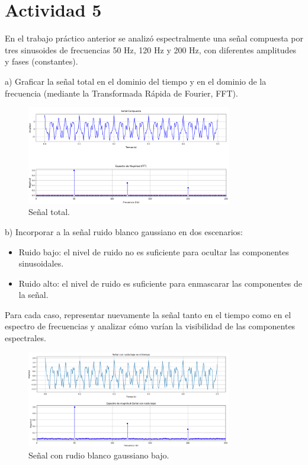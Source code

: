 \section{Actividad 5}
En el trabajo práctico anterior se analizó espectralmente una señal compuesta por tres 
sinusoides de frecuencias 50 Hz, 120 Hz y 200 Hz, con diferentes amplitudes y fases 
(constantes). 

a) Graficar la señal total en el dominio del tiempo y en el dominio de la frecuencia 
(mediante la Transformada Rápida de Fourier, FFT). 

\bigskip
\begin{figure}[H]
\centering
\includegraphics[width=0.8\textwidth]{parte_teorica/senalcompuesta.png}
\caption{Señal total.}
\end{figure}
\bigskip

b) Incorporar a la señal ruido blanco gaussiano en dos escenarios: 

\begin{itemize}
 \item Ruido bajo: el nivel de ruido no es suficiente para ocultar las componentes 
sinusoidales. 
 \item Ruido alto: el nivel de ruido es suficiente para enmascarar las componentes de 
la señal. 
\end{itemize}
Para cada caso, representar nuevamente la señal tanto en el tiempo como en el 
espectro de frecuencias y analizar cómo varían la visibilidad de las componentes 
espectrales. 

\bigskip
\begin{figure}[H]
\centering
\includegraphics[width=0.8\textwidth]{parte_teorica/senalconruidobajo.png}
\caption{Señal con rudio blanco gaussiano bajo.}
\end{figure}
\bigskip

